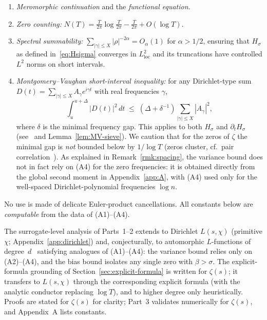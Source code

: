 \begin{enumerate}
\item[(A1)] \emph{Meromorphic continuation} and the \emph{functional equation.}
\item[(A2)] \emph{Zero counting:}
$N(T)=\tfrac{T}{2\pi}\log\tfrac{T}{2\pi}-\tfrac{T}{2\pi}+O(\log T)$.
\item[(A3)] \emph{Spectral summability:}
$\sum_{|\gamma|\le X}|\rho|^{-2\alpha}=O_\alpha(1)$ for $\alpha>1/2$,
ensuring that $H_\sigma$ as defined in~\eqref{eq:Hsigma} converges in
$L^2_{\mathrm{loc}}$ and its truncations have controlled $L^2$ norms on short intervals.
\item[(A4)] \emph{Montgomery--Vaughan short-interval inequality:} for any
Dirichlet-type sum $D(t)=\sum_{|\gamma|\le X}A_\gamma e^{i\gamma t}$
with real frequencies $\gamma$,
\[
\int_u^{u+\Delta}\!|D(t)|^2\,dt
\;\le\; (\Delta+\delta^{-1})\sum_{|\gamma|\le X}|A_\gamma|^2,
\]
where $\delta$ is the minimal frequency gap.  This applies to both $H_\sigma$ and
$\partial_t H_\sigma$ (see~\cite{montgomery-vaughan} and Lemma~\ref{lem:MV-sieve}).
We caution that for the zeros of $\zeta$ the minimal gap is \emph{not} bounded
below by $1/\log T$ (zeros cluster, cf.\ pair correlation~\cite{montgomery-pair}).
As explained in Remark~\ref{rmk:spacing}, the variance bound does not in fact
rely on (A4) for the zero frequencies: it is obtained directly from the global
second moment in Appendix~\ref{app:A}, with (A4) used only for the well-spaced
Dirichlet-polynomial frequencies $\log n$.
\end{enumerate}
No use is made of delicate Euler-product cancellations.  All constants below are
\emph{computable} from the data of (A1)–(A4).

\begin{remark}
The surrogate-level analysis of Parts~1–2 extends to Dirichlet $L(s,\chi)$
(primitive $\chi$; Appendix~\ref{app:dirichlet}) and, conjecturally, to
automorphic $L$-functions of degree~$d$~\cite{selberg} satisfying analogues of
(A1)–(A4): the variance bound relies only on (A2)–(A4), and the bias bound
isolates any single zero with $\beta>\sigma$.  The explicit-formula grounding of
Section~\ref{sec:explicit-formula} is written for $\zeta(s)$; it transfers to
$L(s,\chi)$ through the corresponding explicit formula (with the analytic
conductor replacing $\log T$), and to higher degree only heuristically.
Proofs are stated for $\zeta(s)$ for clarity; Part~3 validates numerically for
$\zeta(s)$, and Appendix~A lists constants.
\end{remark}

